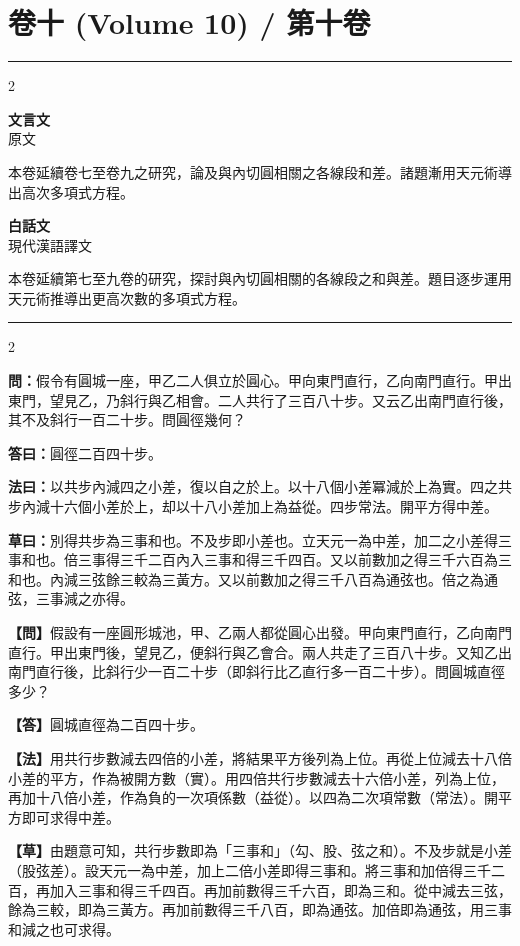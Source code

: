 \documentclass[11pt,a4paper]{article}
\newcommand{\longline}{\noindent\rule{\textwidth}{0.4pt}}
\newcommand{\wenC}[1]{\par\noindent\textbf{\textcolor{probcolor}{問：}}{#1}\par}
\newcommand{\daC}[1]{\par\noindent\textbf{\textcolor{anscolor}{答曰：}}{#1}\par}
\newcommand{\fayueC}[1]{\par\noindent\textbf{\textcolor{methodcolor}{法曰：}}{#1}\par}
\newcommand{\caoyueC}[1]{\par\noindent\textbf{草曰：}{#1}\par}
\newcommand{\wenM}[1]{\par\noindent\textbf{\textcolor{probcolor}{【問】}}{#1}\par}
\newcommand{\daM}[1]{\par\noindent\textbf{\textcolor{anscolor}{【答】}}{#1}\par}
\newcommand{\fayueM}[1]{\par\noindent\textbf{\textcolor{methodcolor}{【法】}}{#1}\par}
\newcommand{\caoyueM}[1]{\par\noindent\textbf{【草】}{#1}\par}
\newcommand{\leftlabel}{\begin{center}\textbf{\large\color{probcolor} 文言文}\\{\small 原文}\end{center}\vspace{0.3cm}}
\newcommand{\rightlabel}{\begin{center}\textbf{\large\color{methodcolor} 白話文}\\{\small 現代漢語譯文}\end{center}\vspace{0.3cm}}
\begin{document}
\newpage

\section{卷十 (Volume 10) / 第十卷}
\label{sec:vol10}

\longline

\begin{paracol}{2}
\leftlabel
本卷延續卷七至卷九之研究，論及與內切圓相關之各線段和差。諸題漸用天元術導出高次多項式方程。

\switchcolumn
\rightlabel
本卷延續第七至九卷的研究，探討與內切圓相關的各線段之和與差。題目逐步運用天元術推導出更高次數的多項式方程。

\end{paracol}

\vspace{0.3cm}
\longline

\begin{paracol}{2}

\wenC{假令有圓城一座，甲乙二人俱立於圓心。甲向東門直行，乙向南門直行。甲出東門，望見乙，乃斜行與乙相會。二人共行了三百八十步。又云乙出南門直行後，其不及斜行一百二十步。問圓徑幾何？}

\daC{圓徑二百四十步。}

\fayueC{以共步內減四之小差，復以自之於上。以十八個小差冪減於上為實。四之共步內減十六個小差於上，却以十八小差加上為益從。四步常法。開平方得中差。}

\caoyueC{別得共步為三事和也。不及步即小差也。立天元一為中差，加二之小差得三事和也。倍三事得三千二百內入三事和得三千四百。又以前數加之得三千六百為三和也。內減三弦餘三較為三黃方。又以前數加之得三千八百為通弦也。倍之為通弦，三事減之亦得。}

\switchcolumn

\wenM{假設有一座圓形城池，甲、乙兩人都從圓心出發。甲向東門直行，乙向南門直行。甲出東門後，望見乙，便斜行與乙會合。兩人共走了三百八十步。又知乙出南門直行後，比斜行少一百二十步（即斜行比乙直行多一百二十步）。問圓城直徑多少？}

\daM{圓城直徑為二百四十步。}

\fayueM{用共行步數減去四倍的小差，將結果平方後列為上位。再從上位減去十八倍小差的平方，作為被開方數（實）。用四倍共行步數減去十六倍小差，列為上位，再加十八倍小差，作為負的一次項係數（益從）。以四為二次項常數（常法）。開平方即可求得中差。}

\caoyueM{由題意可知，共行步數即為「三事和」（勾、股、弦之和）。不及步就是小差（股弦差）。設天元一為中差，加上二倍小差即得三事和。將三事和加倍得三千二百，再加入三事和得三千四百。再加前數得三千六百，即為三和。從中減去三弦，餘為三較，即為三黃方。再加前數得三千八百，即為通弦。加倍即為通弦，用三事和減之也可求得。}

\end{paracol}
\end{document}
